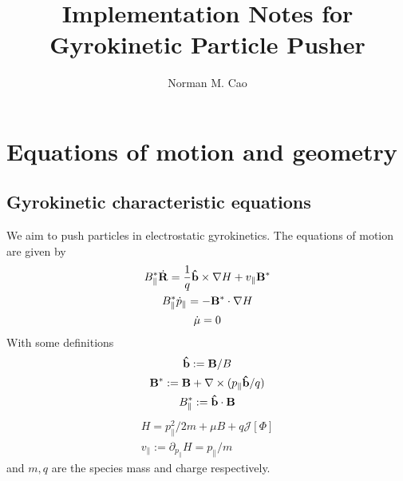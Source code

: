 \documentclass[]{article}
\title{Implementation Notes for Gyrokinetic Particle Pusher}
\author{Norman M. Cao}
\begin{document}
\maketitle

\section{Equations of motion and geometry}

\subsection{Gyrokinetic characteristic equations}
We aim to push particles in electrostatic gyrokinetics.
The equations of motion are given by
\begin{subequations}
	\begin{gather}
		B_\parallel^* \dot{\vb{R}} = \frac{1}{q} \vu{b} \times \nabla H + v_\parallel \vb{B}^* \\
		B_\parallel^* \dot{p}_\parallel = -\vb{B}^* \cdot \nabla H \\
		\dot{\mu} = 0
	\end{gather}
\end{subequations}
With some definitions
\begin{subequations}
	\begin{gather}
		\vu{b} := \vb{B} / B \\
		\vb{B}^* := \vb{B} + \nabla \times (p_\parallel \vu{b} / q) \\
		B_\parallel^* := \vu{b} \cdot \vb{B}
	\end{gather}
\end{subequations}
\begin{subequations}
	\begin{gather}
		H = p_\parallel^2 / 2 m + \mu B + q \mathcal{J}[\Phi] \\
		v_\parallel := \partial_{p_\parallel} H = p_\parallel / m
	\end{gather}
\end{subequations}
and \(m,q\) are the species mass and charge respectively.
\end{document}

